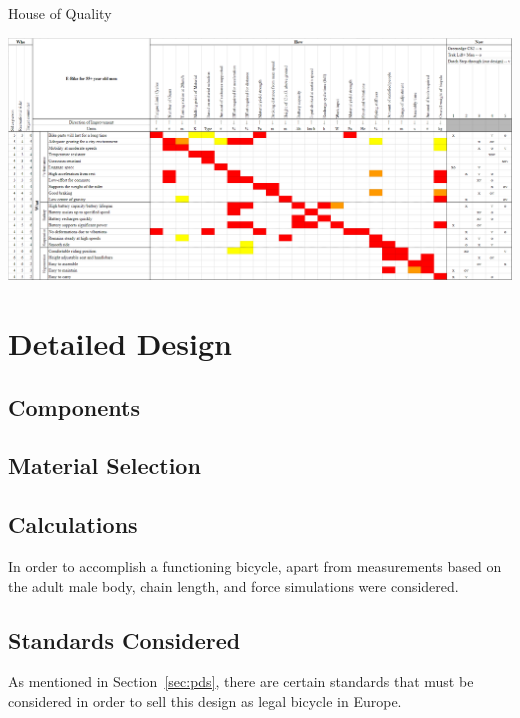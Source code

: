 \documentclass[a4paper,11pt]{article}
\begin{document}
\thispagestyle{empty}
\begin{landscape}

\begin{table}[ht]
	\centering
	\caption{House of Quality}
	\includegraphics[width=1.45\textwidth]{Hoq}
	\label{tab:hoq}
\end{table}

\end{landscape}
\restoregeometry

\section{Detailed Design}

\subsection{Components}

\subsection{Material Selection}

\subsection{Calculations}

In order to accomplish a functioning bicycle, apart from measurements based on the adult male body, chain length, and force simulations were considered.

\subsection{Standards Considered}

As mentioned in Section~\ref{sec:pds}, there are certain standards that must be considered in order to sell this design as legal bicycle in Europe. 
\end{document}
